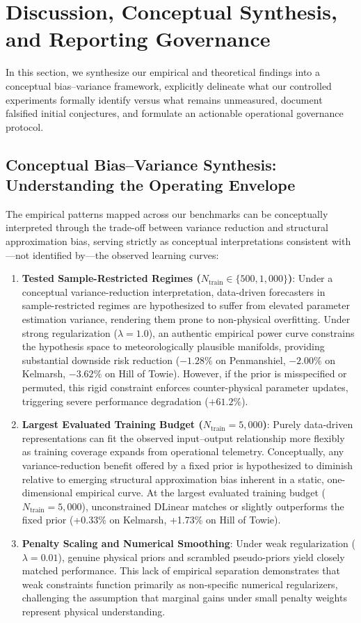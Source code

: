 \section{Discussion, Conceptual Synthesis, and Reporting Governance}
\label{sec:discussion}

In this section, we synthesize our empirical and theoretical findings into a conceptual bias--variance framework, explicitly delineate what our controlled experiments formally identify versus what remains unmeasured, document falsified initial conjectures, and formulate an actionable operational governance protocol.

\subsection{Conceptual Bias--Variance Synthesis: Understanding the Operating Envelope}
The empirical patterns mapped across our benchmarks can be conceptually interpreted through the trade-off between variance reduction and structural approximation bias, serving strictly as conceptual interpretations consistent with---not identified by---the observed learning curves:
\begin{enumerate}[leftmargin=*]
\item \textbf{Tested Sample-Restricted Regimes ($N_{\text{train}} \in \{500, 1{,}000\}$)}: Under a conceptual variance-reduction interpretation, data-driven forecasters in sample-restricted regimes are hypothesized to suffer from elevated parameter estimation variance, rendering them prone to non-physical overfitting. Under strong regularization ($\lambda=1.0$), an authentic empirical power curve constrains the hypothesis space to meteorologically plausible manifolds, providing substantial downside risk reduction ($-1.28\%$ on Penmanshiel, $-2.00\%$ on Kelmarsh, $-3.62\%$ on Hill of Towie). However, if the prior is misspecified or permuted, this rigid constraint enforces counter-physical parameter updates, triggering severe performance degradation ($+61.2\%$).
\item \textbf{Largest Evaluated Training Budget ($N_{\text{train}} = 5{,}000$)}: Purely data-driven representations can fit the observed input--output relationship more flexibly as training coverage expands from operational telemetry. Conceptually, any variance-reduction benefit offered by a fixed prior is hypothesized to diminish relative to emerging structural approximation bias inherent in a static, one-dimensional empirical curve. At the largest evaluated training budget ($N_{\text{train}}=5{,}000$), unconstrained DLinear matches or slightly outperforms the fixed prior (+0.33\% on Kelmarsh, +1.73\% on Hill of Towie).
\item \textbf{Penalty Scaling and Numerical Smoothing}: Under weak regularization ($\lambda=0.01$), genuine physical priors and scrambled pseudo-priors yield closely matched performance. This lack of empirical separation demonstrates that weak constraints function primarily as non-specific numerical regularizers, challenging the assumption that marginal gains under small penalty weights represent physical understanding.
\end{enumerate}
